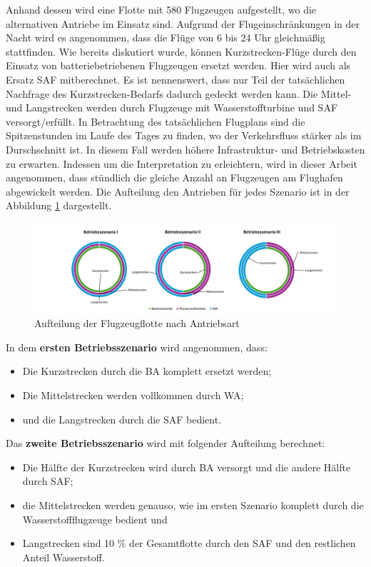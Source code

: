 Anhand dessen wird eine Flotte mit 580 Flugzeugen aufgestellt, wo die alternativen Antriebe im Einsatz sind.
Aufgrund der Flugeinschränkungen in der Nacht wird es angenommen, dass die Flüge von 6 bis 24 Uhr gleichmäßig stattfinden. 
Wie bereits diskutiert wurde, können Kurzstrecken-Flüge durch den Einsatz von batteriebetriebenen Flugzeugen ersetzt werden. Hier wird
auch als Ersatz SAF mitberechnet. Es ist nennenswert, dass nur Teil der tatsächlichen Nachfrage des Kurzstrecken-Bedarfs 
dadurch gedeckt werden kann. Die Mittel- und Langstrecken werden durch Flugzeuge mit Wasserstoffturbine und SAF versorgt/erfüllt.
%
In Betrachtung des tatsächlichen Flugplans sind die Spitzenstunden im Laufe des Tages zu finden, wo
der Verkehrsfluss stärker als im Durschschnitt ist. In diesem Fall werden höhere Infrastruktur- und Betriebskosten zu erwarten.
Indessen um die Interpretation zu erleichtern, wird in dieser Arbeit angenommen, dass stündlich die gleiche Anzahl an Flugzeugen 
am Flughafen abgewickelt werden. 
%
Die Aufteilung den Antrieben für jedes Szenario ist in der Abbildung \ref{betriebsszenarien} dargestellt.
%
\begin{figure}[h]
	\centering
	\includegraphics[width=1.0\linewidth]{Bilder/Betriebsszenarien.png}
	\caption[Betriebsszenarien]{Aufteilung der Flugzeugflotte nach Antriebsart}
	\label{betriebsszenarien}
\end{figure}
%
In dem \textbf{ersten Betriebsszenario} wird angenommen, dass:
\begin{itemize}
    \item Die Kurzstrecken durch die BA komplett ersetzt werden;
    \item Die Mittelstrecken werden vollkommen durch WA;
    \item und die Langstrecken durch die SAF bedient.
\end{itemize}
Das \textbf{zweite Betriebsszenario} wird mit folgender Aufteilung berechnet:
\begin{itemize}
    \item Die Hälfte der Kurzstrecken wird durch BA versorgt und die andere Hälfte durch SAF; 
    \item die Mittelstrecken werden genauso, wie im ersten Szenario komplett durch die Wasserstoffflugzeuge bedient und 
    \item Langstrecken sind 10 \% der Gesamtflotte durch den SAF und den restlichen Anteil Wasserstoff.
\end{itemize}
